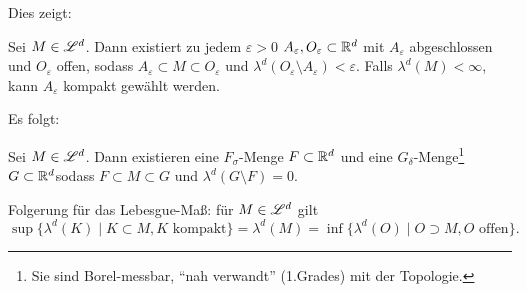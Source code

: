 Dies zeigt:

\begin{satz}
\begin{mdframed}
Sei $M \in \mathscr{L}^d$. Dann existiert zu jedem $\varepsilon>0$ $A_\varepsilon, O_\varepsilon \subset \mathbb{R}^d$ mit $A_\varepsilon$ abgeschlossen und $O_\varepsilon$ offen, sodass
${A_\varepsilon} \subset M \subset {O_\varepsilon}$
und 
$\lambda^d(O_\varepsilon \setminus A_\varepsilon) < \varepsilon$.
Falls $\lambda^d(M)<\infty$, kann $A_\varepsilon$ kompakt gewählt werden.
\end{mdframed}
\end{satz}

Es folgt:
\begin{satz}
\begin{mdframed}
Sei $M\in \mathscr{L}^d$. Dann existieren eine $F_\sigma$-Menge $F\subset \mathbb{R}^d$ und eine $G_\delta$-Menge\footnote{Sie sind Borel-messbar, ``nah verwandt'' (1.Grades) mit der Topologie.}  $G\subset \mathbb{R}^d$sodass $F\subset M \subset G$ und $\lambda^d(G\setminus F)=0$.
\end{mdframed}
\end{satz}

Folgerung für das Lebesgue-Maß: für $M\in \mathscr{L}^d$ gilt
$$
\boxed{\sup\{\lambda^d(K) \mid K \subset M, K \text{ kompakt}\} = \lambda^d(M)=\inf \{\lambda^d(O)\mid O \supset M, O \text{ offen}\}}.
$$

%

